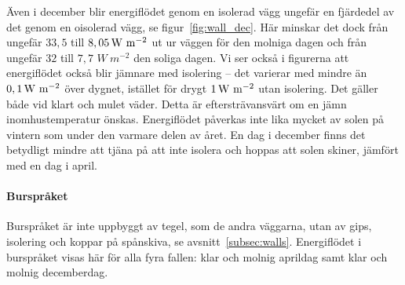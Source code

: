 Även i december blir energiflödet genom en isolerad vägg ungefär en fjärdedel av det 
genom en oisolerad vägg, se figur~\ref{fig:wall_dec}. Här minskar det dock från ungefär $33,5$ 
till $\unit[8,05]{W~m^{-2}}$ ut ur väggen för den molniga dagen och från ungefär $32$ till $7,7$ $\unit{W~m^{-2}}$ den soliga dagen. Vi ser också i figurerna att energiflödet också blir 
jämnare med isolering – det varierar med mindre än $\unit[0,1]{W~m^{-2}}$ över dygnet, 
istället för drygt $\unit[1]{W~m^{-2}}$ utan isolering. Det gäller både vid klart och mulet väder. Detta är eftersträvansvärt om en jämn inomhustemperatur önskas. Energiflödet påverkas inte lika mycket av solen på vintern som under den varmare delen av året. En dag i december finns det betydligt mindre att tjäna på att inte isolera och hoppas att solen skiner, jämfört med en dag i april.

\paragraph{Burspråket}

Burspråket är inte uppbyggt av tegel, som de andra väggarna, utan av gips, isolering och koppar på spånskiva, se avsnitt~\ref{subsec:walls}. Energiflödet i burspråket visas här för alla fyra fallen: klar och molnig aprildag samt klar och molnig decemberdag.

